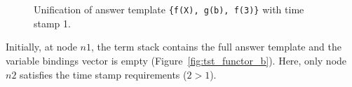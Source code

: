 \begin{figure}
   \qquad
    \\
   
    \\
      
   \caption{Unification of answer template \texttt{\{f(X),~g(b),~f(3)\}} with time stamp 1.}
   \label{fig:tst_functor}
\end{figure}

Initially, at node $n1$, the term stack contains the full answer template and the variable bindings vector
is empty (Figure~\ref{fig:tst_functor_b}). Here, only node $n2$ satisfies the time stamp requirements
($2 > 1$).

